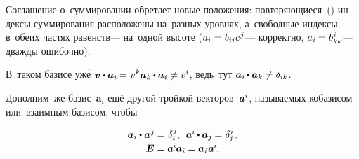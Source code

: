 \begin{otherlanguage}{russian}
{\small\setlength{\abovedisplayskip}{2pt}\setlength{\belowdisplayskip}{2pt}
Соглашение о~суммировании обретает новые положения: повторяющиеся~() индексы суммирования расположены на~\hbox{разных} уровнях, а~свободные индексы в~обеих частях равенств\:--- на~одной высоте (${a_i = \hspace{0.1ex} b_{i\hspace{-0.1ex}j} c^{\hspace{0.2ex}j}}$\:--- корректно, ${a_i \hspace{-0.1ex} = \hspace{0.1ex} b_{kk}^{\hspace{0.1ex}i}}$\:--- дважды ошибочно).
\par}

В~таком базисе уж\'{е} ${\bm{v} \dotp \bm{a}_i \hspace{-0.1ex} = \hspace{0.1ex} v^{k} \bm{a}_k \hspace{-0.1ex} \dotp \bm{a}_i \neq\vspace{0.2ex} v^{i}}$\hspace{-0.25ex}, ведь~тут ${\bm{a}_i \hspace{-0.1ex} \dotp \bm{a}_k \neq\vspace{0.2ex} \delta_{ik}}$.

Дополним~же \hbox{базис}~${\bm{a}_i}$ ещё другой тройкой векторов~\hbox{${\bm{a}^{\hspace{-0.05ex}i}}$\hspace{-0.25ex},} \hbox{называемых} кобазисом или~взаимным базисом, чтобы

\nopagebreak\vspace{-0.2em}\begin{equation}\label{fundamentalpropertyofcobasis}
\begin{array}{c}
\bm{a}_i \dotp \bm{a}^{\hspace{0.1ex}j} \hspace{-0.1ex} = \hspace{0.1ex} \delta_i^{\hspace{0.1ex}j} , \:\:
\bm{a}^{\hspace{-0.05ex}i} \hspace{-0.1ex} \dotp \bm{a}_j \hspace{-0.1ex} = \hspace{0.1ex} \delta_{\hspace{-0.1ex}j}^{\hspace{0.1ex}i} \hspace{0.16ex}, \\[0.2em]
\bm{E} = \bm{a}^{\hspace{-0.1ex}i} \hspace{-0.1ex} \bm{a}_i \hspace{-0.1ex} = \bm{a}_i \hspace{0.1ex} \bm{a}^{\hspace{-0.1ex}i} \hspace{-0.2ex}.
\end{array}
\end{equation}


\end{otherlanguage}
